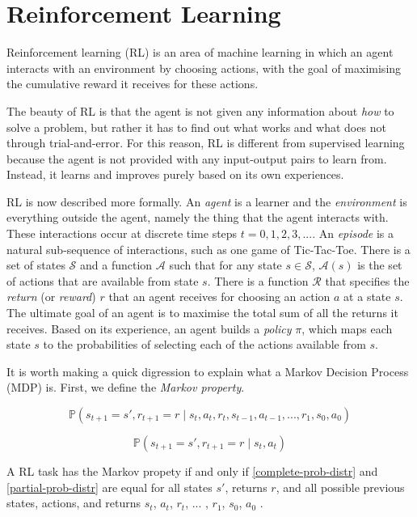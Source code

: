 \documentclass[11pt,a4paper]{report}
\begin{document}
\section{Reinforcement Learning}
\label{sec:RL}

Reinforcement learning (RL) is an area of machine learning in which an agent interacts with an environment by choosing actions, with the goal of maximising the cumulative reward it receives for these actions.

The beauty of RL is that the agent is not given any information about \emph{how} to solve a problem, but rather it has to find out what works and what does not through trial-and-error. For this reason, RL is different from supervised learning because the agent is not provided with any input-output pairs to learn from. Instead, it learns and improves purely based on its own experiences.

RL is now described more formally. An \emph{agent} is a learner and the \emph{environment} is everything outside the agent, namely the thing that the agent interacts with. These interactions occur at discrete time steps $t = 0, 1, 2, 3, ...$. An \emph{episode} is a natural sub-sequence of interactions, such as one game of Tic-Tac-Toe. There is a set of states $\mathcal{S}$ and a function $\mathcal{A}$ such that for any state $s \in \mathcal{S}$, $\mathcal{A}(s)$ is the set of actions that are available from state $s$. There is a function $\mathcal{R}$ that specifies the \emph{return} (or \emph{reward}) $r$ that an agent receives for choosing an action $a$ at a state $s$. The ultimate goal of an agent is to maximise the total sum of all the returns it receives. Based on its experience, an agent builds a \emph{policy} $\pi$, which maps each state $s$ to the probabilities of selecting each of the actions available from $s$.

It is worth making a quick digression to explain what a Markov Decision Process (MDP) is. First, we define the \emph{Markov property}.

\begin{equation}
	\mathbb{P}(s_{t+1} = s', r_{t+1} = r \mid s_t, a_t, r_t, s_{t-1}, a_{t-1}, ... , r_1, s_0, a_0)
 \label{complete-prob-distr}
\end{equation}

\begin{equation}
	\mathbb{P}(s_{t+1} = s', r_{t+1} = r \mid s_t, a_t) \label{partial-prob-distr}
\end{equation}

A RL task has the Markov propety if and only if \ref{complete-prob-distr} and \ref{partial-prob-distr} are equal for all states $s'$, returns $r$, and all possible previous states, actions, and returns $s_t$, $a_t$, $r_t$, ... , $r_1$, $s_0$, $a_0$ \cite{rl-book}.
\end{document}
